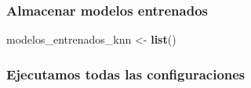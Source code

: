 \documentclass[
]{article}
\newenvironment{Shaded}{\begin{snugshade}}{\end{snugshade}}
\newcommand{\FunctionTok}[1]{\textcolor[rgb]{0.13,0.29,0.53}{\textbf{#1}}}
\newcommand{\NormalTok}[1]{#1}
\newcommand{\OtherTok}[1]{\textcolor[rgb]{0.56,0.35,0.01}{#1}}
\begin{document}
\hypertarget{almacenar-modelos-entrenados-2}{%
\subsubsection{Almacenar modelos
entrenados}\label{almacenar-modelos-entrenados-2}}

\begin{Shaded}
\begin{Highlighting}[]
\NormalTok{modelos\_entrenados\_knn }\OtherTok{\textless{}{-}} \FunctionTok{list}\NormalTok{()}
\end{Highlighting}
\end{Shaded}

\hypertarget{ejecutamos-todas-las-configuraciones-2}{%
\subsubsection{Ejecutamos todas las
configuraciones}\label{ejecutamos-todas-las-configuraciones-2}}
\end{document}
